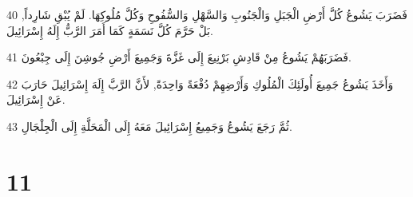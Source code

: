 \par 40 فَضَرَبَ يَشُوعُ كُلَّ أَرْضِ الْجَبَلِ وَالْجَنُوبِ وَالسَّهْلِ وَالسُّفُوحِ وَكُلَّ مُلُوكِهَا. لَمْ يُبْقِ شَارِداً, بَلْ حَرَّمَ كُلَّ نَسَمَةٍ كَمَا أَمَرَ الرَّبُّ إِلَهُ إِسْرَائِيلَ.
\par 41 فَضَرَبَهُمْ يَشُوعُ مِنْ قَادِشِ بَرْنِيعَ إِلَى غَزَّةَ وَجَمِيعَ أَرْضِ جُوشِنَ إِلَى جِبْعُونَ.
\par 42 وَأَخَذَ يَشُوعُ جَمِيعَ أُولَئِكَ الْمُلُوكِ وَأَرْضِهِمْ دُفْعَةً وَاحِدَةً, لأَنَّ الرَّبَّ إِلَهَ إِسْرَائِيلَ حَارَبَ عَنْ إِسْرَائِيلَ.
\par 43 ثُمَّ رَجَعَ يَشُوعُ وَجَمِيعُ إِسْرَائِيلَ مَعَهُ إِلَى الْمَحَلَّةِ إِلَى الْجِلْجَالِ.

\chapter{11}


